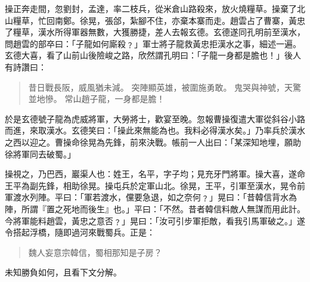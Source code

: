 操正奔走間，忽劉封，孟達，率二枝兵，從米倉山路殺來，放火燒糧草。操棄了北山糧草，忙回南鄭。徐晃，張郃，紮腳不住，亦棄本寨而走。趙雲占了曹寨，黃忠了糧草，漢水所得軍器無數，大獲勝捷，差人去報玄德。玄德遂同孔明前至漢水，問趙雲的部卒曰：「子龍如何廝殺﹖」軍士將子龍救黃忠拒漢水之事，細述一遍。玄德大喜，看了山前山後險峻之路，欣然謂孔明曰：「子龍一身都是膽也！」後人有詩讚曰：

\begin{quote}
昔日戰長阪，威風猶未減。
突陣顯英雄，被圍施勇敢。
鬼哭與神號，天驚並地慘。
常山趙子龍，一身都是膽！
\end{quote}

於是玄德號子龍為虎威將軍，大勞將士，歡宴至晚。忽報曹操復遣大軍從斜谷小路而進，來取漢水。玄德笑曰：「操此來無能為也。我料必得漢水矣。」乃率兵於漢水之西以迎之。曹操命徐晃為先鋒，前來決戰。帳前一人出曰：「某深知地埋，願助徐將軍同去破蜀。」

操視之，乃巴西，巖渠人也：姓王，名平，字子均；見充牙門將軍。操大喜，遂命王平為副先鋒，相助徐晃。操屯兵於定軍山北。徐晃，王平，引軍至漢水，晃令前軍渡水列陣。平曰：「軍若渡水，儻要急退，如之奈何﹖」晃曰：「昔韓信背水為陣，所謂『置之死地而後生』也。」平曰：「不然。昔者韓信料敵人無謀而用此計。今將軍能料趙雲，黃忠之意否﹖」晃曰：「汝可引步軍拒敵，看我引馬軍破之。」遂令搭起浮橋，隨即過河來戰蜀兵。正是：

\begin{quote}
魏人妄意宗韓信，蜀相那知是子房？
\end{quote}

未知勝負如何，且看下文分解。
